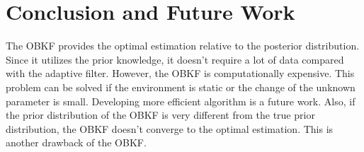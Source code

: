\section{Conclusion and Future Work}\label{sec:conclusion}

The OBKF provides the optimal estimation relative to the posterior distribution. Since it utilizes the prior knowledge, it doesn't require a lot of data compared with the adaptive filter. 
However, the OBKF is computationally expensive. This problem can be solved if the environment is static or the change of the unknown parameter is small. Developing more efficient algorithm is a future work.
Also, if the prior distribution of the OBKF is very different from the true prior distribution, the OBKF doesn't converge to the optimal estimation. This is another drawback of the OBKF.